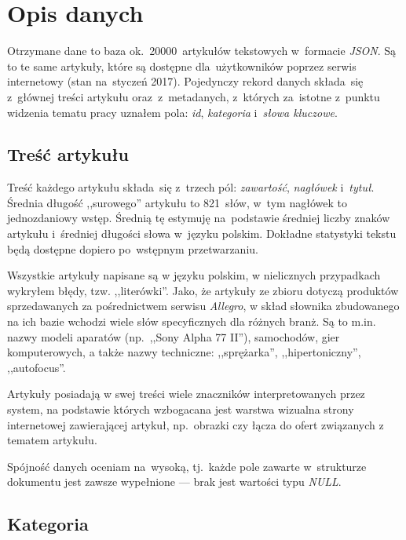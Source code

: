 \documentclass[pl]{minipw} %
\begin{document}
\section{Opis danych}

Otrzymane dane to baza ok.~20000~artykułów tekstowych w~formacie \textit{JSON}. Są to te same artykuły, które są dostępne dla~użytkowników poprzez serwis internetowy (stan na~styczeń 2017). Pojedynczy rekord danych składa~się z~głównej treści artykułu oraz~z~metadanych, z~których za~istotne z~punktu widzenia tematu pracy uznałem pola: \textit{id}, \textit{kategoria} i~\textit{słowa kluczowe}.

\subsection{Treść artykułu}

Treść każdego artykułu składa~się z~trzech pól: \textit{zawartość}, \textit{nagłówek} i~\textit{tytuł}. Średnia długość ,,surowego'' artykułu to 821~słów, w~tym nagłówek to jednozdaniowy wstęp. Średnią tę estymuję na~podstawie średniej liczby znaków artykułu i~średniej długości słowa w~języku polskim. Dokładne statystyki tekstu będą dostępne dopiero po~wstępnym przetwarzaniu.

Wszystkie artykuły napisane są w języku polskim, w nielicznych przypadkach wykryłem błędy, tzw. ,,literówki''. Jako, że artykuły ze zbioru dotyczą produktów sprzedawanych za pośrednictwem serwisu \textit{Allegro}, w skład słownika zbudowanego na ich bazie wchodzi wiele słów specyficznych dla różnych branż. Są to m.in. nazwy modeli aparatów (np.~,,Sony Alpha 77 II''), samochodów, gier komputerowych, a także nazwy techniczne: ,,sprężarka'', ,,hipertoniczny'', ,,autofocus''.

Artykuły posiadają w swej treści wiele znaczników interpretowanych przez system, na podstawie których wzbogacana jest warstwa wizualna strony internetowej zawierającej artykuł, np.~obrazki czy łącza do ofert związanych z tematem artykułu.

Spójność danych oceniam na~wysoką, tj.~każde pole zawarte w~strukturze dokumentu jest zawsze wypełnione --- brak jest wartości typu \textit{NULL}.

\subsection{Kategoria}
\end{document}
